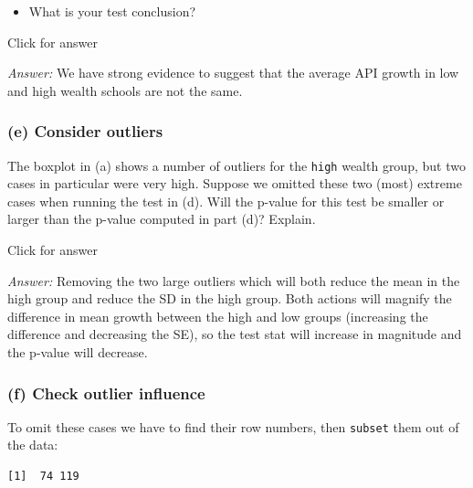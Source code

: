 \documentclass[
]{book}
\newenvironment{Shaded}{\begin{snugshade}}{\end{snugshade}}
\newcommand{\DecValTok}[1]{\textcolor[rgb]{0.00,0.00,0.81}{#1}}
\newcommand{\FunctionTok}[1]{\textcolor[rgb]{0.00,0.00,0.00}{#1}}
\newcommand{\NormalTok}[1]{#1}
\newcommand{\SpecialCharTok}[1]{\textcolor[rgb]{0.00,0.00,0.00}{#1}}
\providecommand{\tightlist}{%
  \setlength{\itemsep}{0pt}\setlength{\parskip}{0pt}}
\begin{document}
\begin{itemize}
\tightlist
\item
  What is your test conclusion?
\end{itemize}

Click for answer

\emph{Answer:} We have strong evidence to suggest that the average API growth in low and high wealth schools are not the same.

\hypertarget{e-consider-outliers-1}{%
\subsubsection{(e) Consider outliers}\label{e-consider-outliers-1}}

The boxplot in (a) shows a number of outliers for the \texttt{high} wealth group, but two cases in particular were very high. Suppose we omitted these two (most) extreme cases when running the test in (d). Will the p-value for this test be smaller or larger than the p-value computed in part (d)? Explain.

Click for answer

\emph{Answer:} Removing the two large outliers which will both reduce the mean in the high group and reduce the SD in the high group. Both actions will magnify the difference in mean growth between the high and low groups (increasing the difference and decreasing the SE), so the test stat will increase in magnitude and the p-value will decrease.

\hypertarget{f-check-outlier-influence-1}{%
\subsubsection{(f) Check outlier influence}\label{f-check-outlier-influence-1}}

To omit these cases we have to find their row numbers, then \texttt{subset} them out of the data:

\begin{Shaded}
\end{Shaded}

\begin{verbatim}
[1]  74 119
\end{verbatim}
\end{document}
